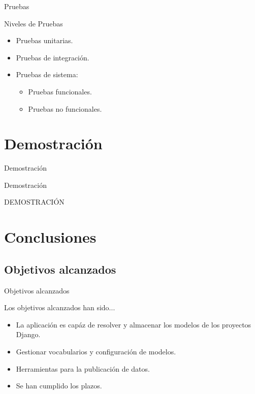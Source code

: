 \documentclass[spanish,xcolor=table,svgnames]{beamer}
\begin{document}
\begin{frame}{Pruebas}
  \begin{block}{Niveles de Pruebas}
    \begin{itemize}
      \item Pruebas unitarias.
      \item Pruebas de integración.
      \item Pruebas de sistema:
      \begin{itemize}
        \item Pruebas funcionales.
        \item Pruebas no funcionales.
      \end{itemize}
  \end{itemize}
  \end{block}
\end{frame}



\section{Demostración}
\begin{frame}{Demostración}
  \tableofcontents[currentsection]
\end{frame}

\begin{frame}{Demostración}
  \begin{center}
    \Huge{DEMOSTRACIÓN}
  \end{center}
\end{frame}


\section{Conclusiones}

\subsection*{Objetivos alcanzados}
\begin{frame}{Objetivos alcanzados}
\begin{block}{Los objetivos alcanzados han sido...}
  \begin{itemize}
    \item La aplicación es capáz de resolver y almacenar los modelos de los
      proyectos Django.
    \item Gestionar vocabularios y configuración de modelos.
    \item Herramientas para la publicación de datos.
    \item Se han cumplido los plazos.
  \end{itemize}
\end{block}
\end{frame}
\end{document}
